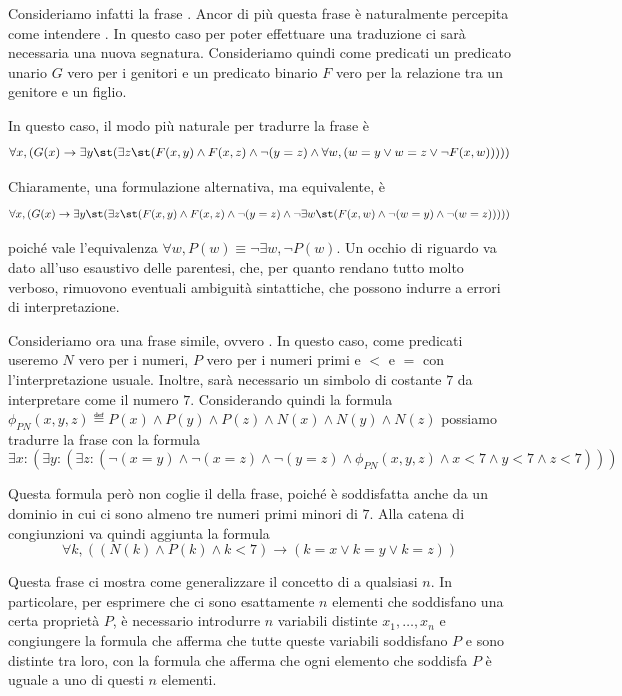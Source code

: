 Consideriamo infatti la frase . Ancor di più questa frase è naturalmente percepita come intendere . In questo caso per poter effettuare una traduzione ci sarà necessaria una nuova segnatura. Consideriamo quindi come predicati un predicato unario \(G\) vero per i genitori e un predicato binario \(F\) vero per la relazione tra un genitore e un figlio.

In questo caso, il modo più naturale per tradurre la frase è
\[\forall x,( G(x) \to \exists y \st(\exists z\st (F(x,y) \land F(x,z) \land \neg(y = z) \land \forall w, (w = y \lor w = z \lor \neg F(x,w)))))\]

Chiaramente, una formulazione alternativa, ma equivalente, è
\[\forall x,( G(x) \to \exists y \st(\exists z\st (F(x,y) \land F(x,z) \land \neg(y = z) \land \neg \exists w\st (F(x,w) \land \neg(w = y) \land \neg(w = z)))))\]

poiché vale l'equivalenza \(\forall w, P(w) \equiv \neg \exists w, \neg P(w)\).
Un occhio di riguardo va dato all'uso esaustivo delle parentesi, che, per quanto rendano tutto molto verboso, rimuovono eventuali ambiguità sintattiche, che possono indurre a errori di interpretazione. 

Consideriamo ora una frase simile, ovvero . In questo caso, come predicati useremo \(N\) vero per i numeri, \(P\) vero per i numeri primi e \(<\) e \(=\) con l'interpretazione usuale. Inoltre, sarà necessario un simbolo di costante \(7\) da interpretare come il numero \(7\). Considerando quindi la formula \(\phi_{PN}(x,y,z) \eqdef P(x) \land P(y) \land P(z) \land N(x) \land N(y) \land N(z) \) possiamo tradurre la frase con la formula
\[\exists x :(\exists y : (\exists z :(\neg (x=y) \land \neg (x=z) \land \neg (y=z) \land \phi_{PN}(x,y,z) \land x<7 \land y<7 \land z<7)))\]

Questa formula però non coglie il  della frase, poiché è soddisfatta anche da un dominio in cui ci sono almeno tre numeri primi minori di \(7\). Alla catena di congiunzioni va quindi aggiunta la formula
\[\forall k, ((N(k)\land P(k) \land k<7) \to (k=x\lor k=y \lor k=z))\]

Questa frase ci mostra come generalizzare il concetto di  a qualsiasi \(n\). In particolare, per esprimere che ci sono esattamente \(n\) elementi che soddisfano una certa proprietà \(P\), è necessario introdurre \(n\) variabili distinte \(x_1, \dots, x_n\) e congiungere la formula che afferma che tutte queste variabili soddisfano \(P\) e sono distinte tra loro, con la formula che afferma che ogni elemento che soddisfa \(P\) è uguale a uno di questi \(n\) elementi.

